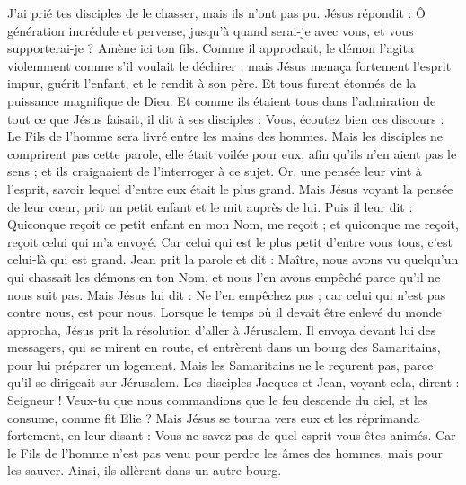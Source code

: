 \begin{multicols}{2}
J'ai prié tes disciples de le chasser, mais ils n'ont pas pu.
Jésus répondit : Ô génération incrédule et perverse, jusqu'à quand serai-je avec vous, et vous supporterai-je ? Amène ici ton fils.
Comme il approchait, le démon l'agita violemment comme s'il voulait le déchirer ; mais Jésus menaça fortement l'esprit impur, guérit l'enfant, et le rendit à son père.
Et tous furent étonnés de la puissance magnifique de Dieu. Et comme ils étaient tous dans l'admiration de tout ce que Jésus faisait, il dit à ses disciples :
Vous, écoutez bien ces discours : Le Fils de l'homme sera livré entre les mains des hommes.
Mais les disciples ne comprirent pas cette parole, elle était voilée pour eux, afin qu'ils n'en aient pas le sens ; et ils craignaient de l'interroger à ce sujet.
Or, une pensée leur vint à l'esprit, savoir lequel d'entre eux était le plus grand.
Mais Jésus voyant la pensée de leur cœur, prit un petit enfant et le mit auprès de lui.
Puis il leur dit : Quiconque reçoit ce petit enfant en mon Nom, me reçoit ; et quiconque me reçoit, reçoit celui qui m'a envoyé. Car celui qui est le plus petit d'entre vous tous, c'est celui-là qui est grand.
Jean prit la parole et dit : Maître, nous avons vu quelqu'un qui chassait les démons en ton Nom, et nous l'en avons empêché parce qu'il ne nous suit pas.
Mais Jésus lui dit : Ne l'en empêchez pas ; car celui qui n'est pas contre nous, est pour nous.
Lorsque le temps où il devait être enlevé du monde approcha, Jésus prit la résolution d'aller à Jérusalem.
Il envoya devant lui des messagers, qui se mirent en route, et entrèrent dans un bourg des Samaritains, pour lui préparer un logement.
Mais les Samaritains ne le reçurent pas, parce qu'il se dirigeait sur Jérusalem.
Les disciples Jacques et Jean, voyant cela, dirent : Seigneur ! Veux-tu que nous commandions que le feu descende du ciel, et les consume, comme fit Elie ?
Mais Jésus se tourna vers eux et les réprimanda fortement, en leur disant : Vous ne savez pas de quel esprit vous êtes animés.
Car le Fils de l'homme n'est pas venu pour perdre les âmes des hommes, mais pour les sauver. Ainsi, ils allèrent dans un autre bourg.

\end{multicols}
